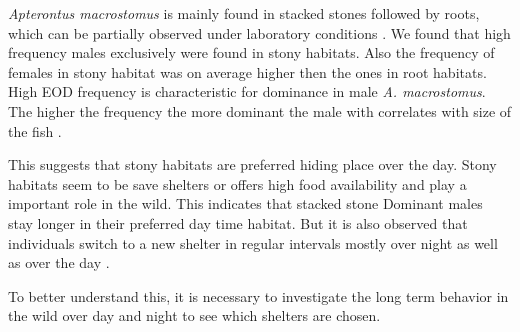 \textit{Apterontus macrostomus} is mainly found in stacked stones followed by roots, which can be partially observed under laboratory conditions \citep{raab2019}. We found that high frequency males exclusively were found in stony habitats. Also the frequency of females in stony habitat was on average higher then the ones in root habitats. High EOD frequency is characteristic for dominance in male \textit{A. macrostomus}. The higher the frequency the more dominant the male with correlates with size of the fish \citep{triefenbach_zakon2003}. 

This suggests that stony habitats are preferred hiding place over the day. Stony habitats seem to be save shelters or offers high food availability and play a important role in the wild. This indicates that stacked stone 
Dominant males stay longer in their preferred day time habitat. But it is also observed that individuals switch to a new shelter in regular intervals mostly over night as well as over the day \citep{raab2019}. 


To better understand this, it is necessary to investigate the long term behavior in the wild over day and night to see which shelters are chosen.


